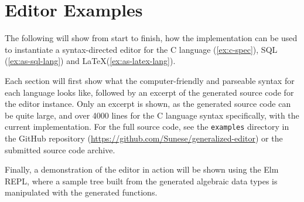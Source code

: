 \chapter{Editor Examples}
\label{ch:examples}

The following will show from start to finish, how the implementation
can be used to instantiate a syntax-directed editor for the C language (\cref{ex:c-spec}),
SQL (\cref{ex:as-sql-lang}) and \LaTeX (\cref{ex:as-latex-lang}).

Each section will first show what the computer-friendly and parseable syntax
for each language looks like, followed by an excerpt of the generated
source code for the editor instance. Only an excerpt is shown, as the
generated source code can be quite large, and over 4000 lines for the C language
syntax specifically, with the current implementation. For the full source code,
see the \texttt{examples} directory in the GitHub repository
(\url{https://github.com/Sunese/generalized-editor}) or the
submitted source code archive.

Finally, a demonstration of the editor
in action will be shown using the Elm REPL, where a sample tree built
from the generated algebraic data types is manipulated with the generated functions.

